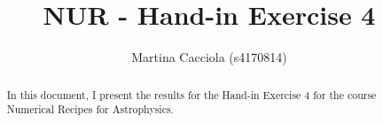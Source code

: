 \documentclass[a4paper,10pt]{article}
\title{NUR - Hand-in Exercise 4}
\author{Martina Cacciola (s4170814)}
\begin{document}
\maketitle

\begin{abstract}
 In this document, I present the results for the Hand-in Exercise 4 for the 
 course Numerical Recipes for Astrophysics.
\end{abstract}


\end{document}
